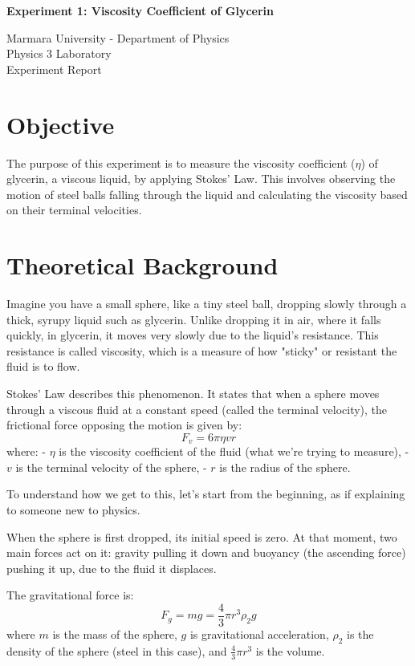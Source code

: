 \documentclass[12pt, a4paper]{article}
\begin{document}
\begin{center}
	\Large \textbf{Experiment 1: Viscosity Coefficient of Glycerin}
	\vspace{0.5cm}
	    
	\normalsize Marmara University - Department of Physics \\
	Physics 3 Laboratory \\
	Experiment Report
	\vspace{0.5cm}
\end{center}

\section{Objective}
The purpose of this experiment is to measure the viscosity coefficient ($\eta$) of glycerin, a viscous liquid, by applying Stokes' Law. This involves observing the motion of steel balls falling through the liquid and calculating the viscosity based on their terminal velocities.

\section{Theoretical Background}
Imagine you have a small sphere, like a tiny steel ball, dropping slowly through a thick, syrupy liquid such as glycerin. Unlike dropping it in air, where it falls quickly, in glycerin, it moves very slowly due to the liquid's resistance. This resistance is called viscosity, which is a measure of how "sticky" or resistant the fluid is to flow.

Stokes' Law describes this phenomenon. It states that when a sphere moves through a viscous fluid at a constant speed (called the terminal velocity), the frictional force opposing the motion is given by:
\[ F_v = 6\pi \eta v r \]
where:
- $\eta$ is the viscosity coefficient of the fluid (what we're trying to measure),
- $v$ is the terminal velocity of the sphere,
- $r$ is the radius of the sphere.

To understand how we get to this, let's start from the beginning, as if explaining to someone new to physics.

When the sphere is first dropped, its initial speed is zero. At that moment, two main forces act on it: gravity pulling it down and buoyancy (the ascending force) pushing it up, due to the fluid it displaces.

The gravitational force is:
\[ F_g = m g = \frac{4}{3} \pi r^3 \rho_2 g \]
where $m$ is the mass of the sphere, $g$ is gravitational acceleration, $\rho_2$ is the density of the sphere (steel in this case), and $\frac{4}{3} \pi r^3$ is the volume.
\end{document}
